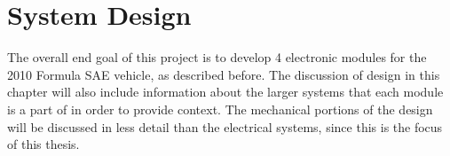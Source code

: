 \chapter{System Design\label{ch:design}}

The overall end goal of this project is to develop 4 electronic modules for the 2010 Formula SAE vehicle, as described before. The discussion of design in this chapter will also include information about the larger systems that each module is a part of in order to provide context. The mechanical portions of the design will be discussed in less detail than the electrical systems, since this is the focus of this thesis.











